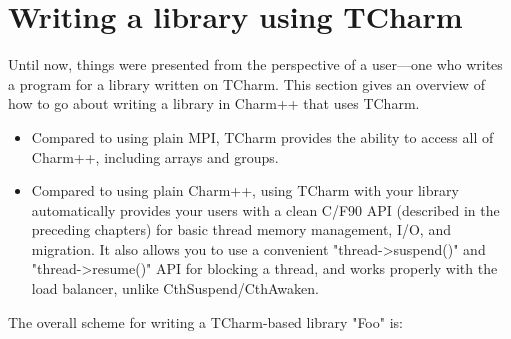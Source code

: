 \documentclass[10pt]{article}
\begin{document}
\section{Writing a library using TCharm}
\label{sec:tlib}

Until now, things were presented from the perspective of a user---one 
who writes a program for a library written on TCharm. This section gives an
overview of how to go about writing a library in Charm++ that uses TCharm.

\begin{itemize}
\item Compared to using plain MPI, TCharm provides the ability to 
access all of Charm++, including arrays and groups.

\item Compared to using plain Charm++,
using TCharm with your library automatically provides your users with a 
clean C/F90 API (described in the preceding chapters) for basic thread
memory  management, I/O, and migration.  It also allows you to use a convenient
"thread->suspend()" and "thread->resume()" API for blocking a thread,
and works properly with the load balancer, unlike CthSuspend/CthAwaken.
\end{itemize}

The overall scheme for writing a TCharm-based library "Foo" is:
\end{document}
